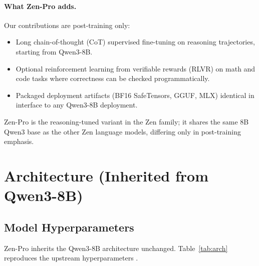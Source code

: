 \documentclass[11pt,a4paper]{article}
\begin{document}
\paragraph{What Zen-Pro adds.} Our contributions are post-training only:

\begin{itemize}
  \item Long chain-of-thought (CoT) supervised fine-tuning on reasoning trajectories, starting from
        Qwen3-8B.
  \item Optional reinforcement learning from verifiable rewards (RLVR) on math and code tasks where
        correctness can be checked programmatically.
  \item Packaged deployment artifacts (BF16 SafeTensors, GGUF, MLX) identical in interface to any
        Qwen3-8B deployment.
\end{itemize}

Zen-Pro is the reasoning-tuned variant in the Zen family; it shares the same 8B Qwen3 base as the
other Zen language models, differing only in post-training emphasis.

\section{Architecture (Inherited from Qwen3-8B)}

\subsection{Model Hyperparameters}

Zen-Pro inherits the Qwen3-8B architecture unchanged. Table~\ref{tab:arch} reproduces the upstream
hyperparameters \cite{qwen3hf}.
\end{document}
